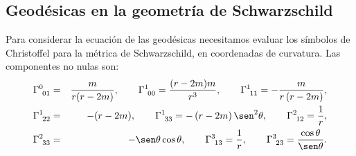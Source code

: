%
%

\subsection{Geodésicas en la geometría de Schwarzschild}

Para considerar la ecuación de las geodésicas necesitamos evaluar los
símbolos de Christoffel para la métrica de Schwarzschild, en coordenadas de curvatura. Las componentes no nulas son:
\begin{eqnarray}
\Gamma_{\ 01}^{0} &=&\frac{m}{r(r-2m) },\qquad \Gamma_{\
00}^1=\frac{(r-2m) m}{r^3},\qquad \Gamma_{\ 11}^1=-\frac{m}{r\left(
r-2m\right) }, \nonumber \\
\Gamma_{\ 22}^1 &=&-(r-2m) ,\qquad \Gamma_{\ 33}^1=-\left(
r-2m\right) \sen ^2\theta ,\qquad \Gamma_{\ 12}^2=\frac{1}{r}, \nonumber \\
\Gamma_{\ 33}^2 &=&-\sen \theta \cos \theta ,\qquad
\Gamma_{\ 13}^3=\frac{1}{r},\qquad \Gamma_{\ 23}^3=\frac{\cos\theta}{\sen
\theta}.
\end{eqnarray}

